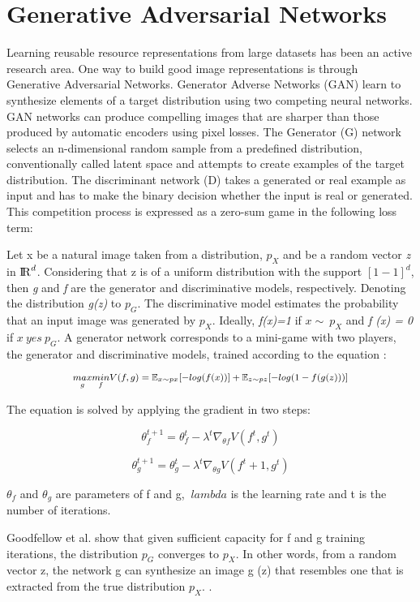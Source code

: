 \section{Generative Adversarial Networks}

Learning reusable resource representations from large datasets has been an active research area. One way to build good image representations is through Generative Adversarial Networks. Generator Adverse Networks (GAN) learn to synthesize elements of a target distribution using two competing neural networks. GAN networks can produce compelling images that are sharper than those produced by automatic encoders using pixel losses. The Generator (G) network selects an n-dimensional random sample from a predefined distribution, conventionally called latent space and attempts to create examples of the target distribution. The discriminant network (D) takes a generated or real example as input and has to make the binary decision whether the input is real or generated. This competition process is expressed as a zero-sum game in the following loss term:

Let x be a natural image taken from a distribution, $ p_X$ and be a random vector \textit{z} in $ {\rm I\!R}^d $. Considering that z is of a uniform distribution with the support $[1-1]^d$, then \textit{g} and \textit{f} are the generator and discriminative models, respectively. Denoting the distribution \textit{g(z)} to $ p_G $. The discriminative model estimates the probability that an input image was generated by $ p_X $. Ideally, \textit{f(x)=1}  if $x  \sim\  p_X$ and \textit{f (x) = 0} if $ x \ yes \ p_G $. A generator network corresponds to a mini-game with two players, the generator and discriminative models, trained according to the equation \cite{Liu2016}:


\begin{equation}
\medmath{ \underset{g}{max} \underset{f}{min} V(f,g)= \mathbb{E}_{x \sim px} [-log(f(x))]+\mathbb{E}_{z \sim pz}[-log(1-f(g(z)))]} 
\end{equation}


The equation is solved by applying the gradient in two steps:

\begin{equation}
\theta^{t+1}_{f} = \theta^{t}_{f} -\lambda^t \nabla_{\theta f} V (f^t, g^t)
\end{equation}

\begin{equation}
\theta^{t+1}_{g} = \theta^{t}_{g} -\lambda^t \nabla_{\theta g} V (f^t+1, g^t)
\end{equation}


$ \theta_f $ and $ \theta_g $ are parameters of f and g, $ \ lambda $ is the learning rate and t is the number of iterations.

Goodfellow et al. show that given sufficient capacity for f and g training iterations, the distribution $ p_G $ converges to $ p_X $. In other words, from a random vector z, the network g can synthesize an image g (z) that resembles one that is extracted from the true distribution $ p_X $. \cite{Goodfellow2014}.